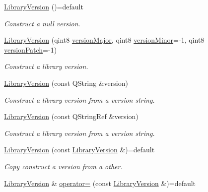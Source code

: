 \begin{DoxyCompactItemize}
\item 
\hyperlink{class_mdt_1_1_deploy_utils_1_1_library_version_ad9df7f4a011f6053ae40ae0d5f139c23}{Library\+Version} ()=default
\begin{DoxyCompactList}\small\item\em Construct a null version. \end{DoxyCompactList}\item 
\hyperlink{class_mdt_1_1_deploy_utils_1_1_library_version_a94dd31adbe68dba547d67c0956669989}{Library\+Version} (qint8 \hyperlink{class_mdt_1_1_deploy_utils_1_1_library_version_a12ad69de5e906500584d7c6f84c1f4b3}{version\+Major}, qint8 \hyperlink{class_mdt_1_1_deploy_utils_1_1_library_version_a5974023e15b6810679f88ed1c0f8cd89}{version\+Minor}=-\/1, qint8 \hyperlink{class_mdt_1_1_deploy_utils_1_1_library_version_a28dd254e9f168d136f8938d6f8860e08}{version\+Patch}=-\/1)
\begin{DoxyCompactList}\small\item\em Construct a library version. \end{DoxyCompactList}\item 
\hyperlink{class_mdt_1_1_deploy_utils_1_1_library_version_a3e956306079849688ebf9889ec9ea192}{Library\+Version} (const Q\+String \&version)
\begin{DoxyCompactList}\small\item\em Construct a library version from a version string. \end{DoxyCompactList}\item 
\hyperlink{class_mdt_1_1_deploy_utils_1_1_library_version_aaac2f9f67caca950957270512ddff372}{Library\+Version} (const Q\+String\+Ref \&version)
\begin{DoxyCompactList}\small\item\em Construct a library version from a version string. \end{DoxyCompactList}\item 
\hyperlink{class_mdt_1_1_deploy_utils_1_1_library_version_a1bb3b5c62f995a638b2470523954cfd3}{Library\+Version} (const \hyperlink{class_mdt_1_1_deploy_utils_1_1_library_version}{Library\+Version} \&)=default
\begin{DoxyCompactList}\small\item\em Copy construct a version from a other. \end{DoxyCompactList}\item 
\hyperlink{class_mdt_1_1_deploy_utils_1_1_library_version}{Library\+Version} \& \hyperlink{class_mdt_1_1_deploy_utils_1_1_library_version_a94b675ac2b9536b17b6589cf022fb7d1}{operator=} (const \hyperlink{class_mdt_1_1_deploy_utils_1_1_library_version}{Library\+Version} \&)=default

\end{DoxyCompactItemize}
